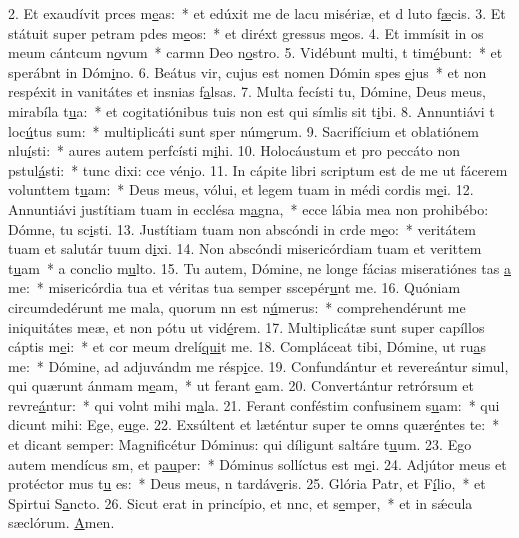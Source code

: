 2. Et exaudívit prces m\uline{e}as:~* et edúxit me de lacu misériæ, et d luto f\uline{æ}cis.
3. Et státuit super petram pdes m\uline{e}os:~* et diréxt gressus m\uline{e}os.
4. Et immísit in os meum cántcum n\uline{o}vum~* carmn Deo n\uline{o}stro.
5. Vidébunt multi, t tim\uline{é}bunt:~* et sperábnt in Dóm\uline{i}no.
6. Beátus vir, cujus est nomen Dómin spes \uline{e}jus~* et non respéxit in vanitátes et insnias f\uline{a}lsas.
7. Multa fecísti tu, Dómine, Deus meus, mirabíla t\uline{u}a:~* et cogitatiónibus tuis non est qui símlis sit t\uline{i}bi.
8. Annuntiávi t loc\uline{ú}tus sum:~* multiplicáti sunt sper núm\uline{e}rum.
9. Sacrifícium et oblatiónem nlu\uline{í}sti:~* aures autem perfcísti m\uline{i}hi.
10. Holocáustum et pro peccáto non pstul\uline{á}sti:~* tunc dixi: cce vén\uline{i}o.
11. In cápite libri scriptum est de me ut fácerem volunttem t\uline{u}am:~* Deus meus, vólui, et legem tuam in médi cordis m\uline{e}i.
12. Annuntiávi justítiam tuam in ecclésa m\uline{a}gna,~* ecce lábia mea non prohibébo: Dómne, tu sc\uline{i}sti.
13. Justítiam tuam non abscóndi in crde m\uline{e}o:~* veritátem tuam et salutár tuum d\uline{i}xi.
14. Non abscóndi misericórdiam tuam et verittem t\uline{u}am~* a conclio m\uline{u}lto.
15. Tu autem, Dómine, ne longe fácias miseratiónes tas \uline{a} me:~* misericórdia tua et véritas tua semper sscepér\uline{u}nt me.
16. Quóniam circumdedérunt me mala, quorum nn est n\uline{ú}merus:~* comprehendérunt me iniquitátes meæ, et non pótu ut vid\uline{é}rem.
17. Multiplicátæ sunt super capíllos cáptis m\uline{e}i:~* et cor meum drelí\uline{qui}t me.
18. Compláceat tibi, Dómine, ut ru\uline{a}s me:~* Dómine, ad adjuvándm me résp\uline{i}ce.
19. Confundántur et revereántur simul, qui quærunt ánmam m\uline{e}am,~* ut ferant \uline{e}am.
20. Convertántur retrórsum et revre\uline{á}ntur:~* qui volnt mihi m\uline{a}la.
21. Ferant conféstim confusinem s\uline{u}am:~* qui dicunt mihi: Ege, e\uline{u}ge.
22. Exsúltent et læténtur super te omns quær\uline{é}ntes te:~* et dicant semper: Magnificétur Dóminus: qui díligunt saltáre t\uline{u}um.
23. Ego autem mendícus sm, et p\uline{au}per:~* Dóminus sollíctus est m\uline{e}i.
24. Adjútor meus et protéctor mus t\uline{u} es:~* Deus meus, n tardáv\uline{e}ris.
25. Glória Patr, et F\uline{í}lio,~* et Spirtui S\uline{a}ncto.
26. Sicut erat in princípio, et nnc, et s\uline{e}mper,~* et in sǽcula sæclórum. \uline{A}men.
